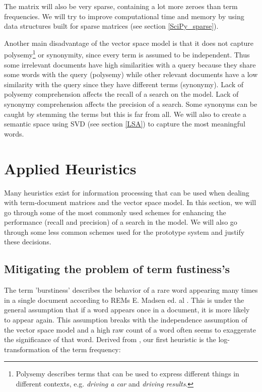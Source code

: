The matrix will also be very sparse, containing a lot more zeroes than
term frequencies. We will try to improve computational time and memory
by using data structures built for sparse matrices (see section
\ref{SciPy_sparse}). 

Another main disadvantage of the vector space model is that it does
not capture polysemy\footnote{Polysemy describes terms that can be
  used to express different things in different contexts,
  e.g. \textit{driving a car} and \textit{driving results}.} or
synonymity, since every term is assumed to be independent. Thus some
irrelevant documents have high similarities with a query because they
share some words with the query (polysemy) while other relevant
documents have a low similarity with the query since they have
different terms (synonymy).  Lack of polysemy comprehension affects
the recall of a search on the model. Lack of synonymy comprehension
affects the precision of a search. Some synonyms can be caught by
stemming the terms but this is far from all. We will also to create a
semantic space using SVD (see section \ref{LSA}) to capture the most
meaningful words.

\section{Applied Heuristics}

Many heuristics exist for information processing that can be
used when dealing with term-document matrices and the vector space
model. In this section, we will go through some of the most commonly
used schemes for enhancing the performance (recall and precision) of a
search in the model. We will also go through some less common schemes
used for the prototype system and justify these decisions.

\subsection{Mitigating the problem of term fustiness's\label{MitigatingBurstiness}}

The term 'burstiness' describes the behavior of a rare word appearing
many times in a single document according to REMs E. Madsen ed. al
\cite{ModelingWordBurstiness2005}. This is under the general
assumption that if a word appears once in a document, it is more
likely to appear again. This assumption breaks with the independence
assumption of the vector space model and a high raw count of a word
often seems to exaggerate the significance of that word. Derived from
\cite{ModelingWordBurstiness2005}, our first heuristic is the
log-transformation of the term frequency:

